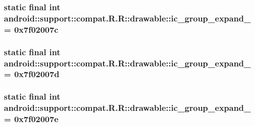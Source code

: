\hypertarget{classandroid_1_1support_1_1compat_1_1_r_1_1drawable_031e0844b14026b0a8ce9dd279591863}{
\subsubsection[{ic\_\-group\_\-expand\_\-13}]{\setlength{\rightskip}{0pt plus 5cm}static final int android::support::compat.R.R::drawable::ic\_\-group\_\-expand\_ = 0x7f02007c}}
\label{classandroid_1_1support_1_1compat_1_1_r_1_1drawable_031e0844b14026b0a8ce9dd279591863}


\hypertarget{classandroid_1_1support_1_1compat_1_1_r_1_1drawable_5cf17961a61a9167cbeed834475cc171}{
\subsubsection[{ic\_\-group\_\-expand\_\-14}]{\setlength{\rightskip}{0pt plus 5cm}static final int android::support::compat.R.R::drawable::ic\_\-group\_\-expand\_ = 0x7f02007d}}
\label{classandroid_1_1support_1_1compat_1_1_r_1_1drawable_5cf17961a61a9167cbeed834475cc171}


\hypertarget{classandroid_1_1support_1_1compat_1_1_r_1_1drawable_892cb13427c8321e330f30ea65e5fc94}{
\subsubsection[{ic\_\-group\_\-expand\_\-15}]{\setlength{\rightskip}{0pt plus 5cm}static final int android::support::compat.R.R::drawable::ic\_\-group\_\-expand\_ = 0x7f02007e}}
\label{classandroid_1_1support_1_1compat_1_1_r_1_1drawable_892cb13427c8321e330f30ea65e5fc94}


